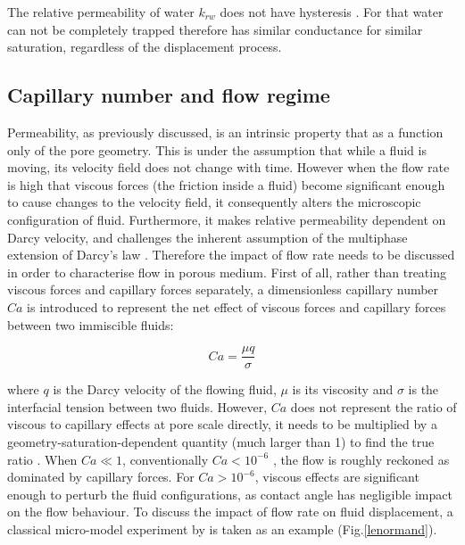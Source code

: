 The relative permeability of water $k_{rw}$ does not have hysteresis \citep{blunt2017multiphase}. For that water can not be completely trapped therefore has similar conductance for similar saturation, regardless of the displacement process. 

\subsection{Capillary number and flow regime}
Permeability, as previously discussed, is an intrinsic property that as a function only of the pore geometry. This is under the assumption that while a fluid is moving, its velocity field does not change with time. However when the flow rate is high that viscous forces (the friction inside a fluid) become significant enough to cause changes to the velocity field, it consequently alters the microscopic configuration of fluid. Furthermore, it makes relative permeability dependent on Darcy velocity, and challenges the inherent assumption of the multiphase extension of Darcy's law \citep{blunt2017multiphase}. Therefore the impact of flow rate needs to be discussed in order to characterise flow in porous medium. First of all, rather than treating viscous forces and capillary forces separately, a dimensionless capillary number $Ca$ is introduced to represent the net effect of viscous forces and capillary forces between two immiscible fluids:

\begin{equation}
    Ca= \frac{\mu q}{\sigma}
\end{equation}

where $q$ is the Darcy velocity of the flowing fluid, $\mu$ is its viscosity and $\sigma$ is the interfacial tension between two fluids. However, $Ca$ does not represent the ratio of viscous to capillary effects at pore scale directly, it needs to be multiplied by a geometry-saturation-dependent quantity (much larger than 1) to find the true ratio \citep{blunt2017multiphase}. When $Ca \ll 1$, conventionally $Ca<10^{-6}$ \citep{blunt2017multiphase}, the flow is roughly reckoned as dominated by capillary forces. For $Ca>10^{-6}$, viscous effects are significant enough to perturb the fluid configurations, as contact angle has negligible impact on the flow behaviour. To discuss the impact of flow rate on fluid displacement, a classical micro-model experiment by \citet{lenormand1984role} is taken as an example (Fig.\ref{lenormand}). 

